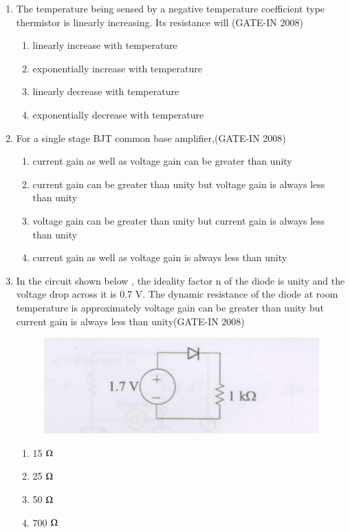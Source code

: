 \documentclass[journal,12pt,onecolumn]{IEEEtran}
\theoremstyle{remark}
\begin{document}
\begin{enumerate}
    \item The temperature being sensed by a negative temperature coefficient  type thermistor is linearly increasing. Its resistance will \hfill{(GATE-IN 2008)}
    \begin{multicols}{2}
    \begin{enumerate} 
        \item linearly increase with temperature
        \item exponentially increase with temperature 
        \item linearly decrease with temperature
        \item exponentially decrease with temperature
    \end{enumerate}
    \end{multicols}
    
    \item For a single stage BJT common base amplifier,\hfill{(GATE-IN 2008)}
    \begin{enumerate} 
        \item current gain as well as voltage gain can be greater than unity
        \item current gain can be greater than unity but voltage gain is always less than unity 
        \item voltage gain can be greater than unity but current gain is always less than unity 
        \item current gain as well as voltage gain is always less than unity
    \end{enumerate}
    
    \item In the circuit shown below , the ideality factor n of the diode is unity and the voltage drop across it
is 0.7 V. The dynamic resistance of the diode at room temperature is approximately  voltage gain can be greater than unity but current gain is always less than unity\hfill{(GATE-IN 2008)}

 \begin{figure}[H]
    \centering
    \includegraphics[width=0.5\columnwidth]{figs/i3.jpg}
    \caption{}
    \label{fig:q9_circuit}
\end{figure}
\begin{multicols}{4}
    \begin{enumerate} 
        \item 15 $\ohm$
        \item 25 $\ohm$
        \item 50 $\ohm$
        \item 700 $\ohm$
    \end{enumerate}
    \end{multicols}
    

\end{enumerate}
\end{document}
